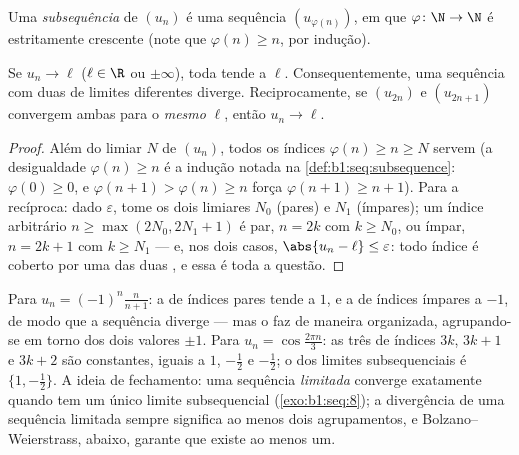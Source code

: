 \begin{definition}[Subsequência]\label{def:b1:seq:subsequence}
Uma \emph{subsequência} de $(u_n)$ é uma sequência
$(u_{\varphi(n)})$, em que $\varphi \colon \N \to \N$ é estritamente
crescente (note que $\varphi(n) \geq n$, por indução).
\end{definition}

\begin{proposition}\label{prop:b1:seq:subsequences}
Se $u_n \to \ell$ ($\ell \in \R$ ou $\pm\infty$), toda 
tende a $\ell$. Consequentemente, uma sequência com duas 
de limites diferentes diverge. Reciprocamente, se $(u_{2n})$ e
$(u_{2n+1})$ convergem ambas para o \emph{mesmo} $\ell$, então $u_n \to
\ell$.
\end{proposition}

\begin{proof}
Além do limiar $N$ de $(u_n)$, todos os índices $\varphi(n) \geq n
\geq N$ servem (a desigualdade $\varphi(n) \geq n$ é a
indução notada na \cref{def:b1:seq:subsequence}: $\varphi(0)
\geq 0$, e $\varphi(n+1) > \varphi(n) \geq n$ força
$\varphi(n+1) \geq n + 1$). Para a recíproca: dado
$\varepsilon$, tome os dois limiares $N_0$ (pares) e $N_1$
(ímpares); um índice arbitrário $n \geq \max(2N_0, 2N_1 + 1)$ é
par, $n = 2k$ com $k \geq N_0$, ou ímpar, $n = 2k+1$ com
$k \geq N_1$ --- e, nos dois casos, $\abs{u_n - \ell} \leq
\varepsilon$: todo índice é coberto por uma das duas
, e essa é toda a questão.
\end{proof}

\begin{example}\label{ex:b1:seq:sublimits}
Para $u_n = (-1)^n \frac{n}{n+1}$: a  de índices pares tende a
$1$, e a de índices ímpares a $-1$, de modo que a sequência diverge ---
mas o faz de maneira organizada, agrupando-se em torno dos dois valores
$\pm 1$. Para $u_n = \cos\frac{2\pi n}{3}$: as três  de
índices $3k$, $3k + 1$ e $3k + 2$ são constantes, iguais a $1$,
$-\frac12$ e $-\frac12$; o  dos limites subsequenciais é $\{1,
-\frac12\}$. A ideia de fechamento: uma sequência \emph{limitada}
converge exatamente quando tem um único limite subsequencial
(\cref{exo:b1:seq:8}); a divergência de uma sequência limitada sempre
significa ao menos dois agrupamentos, e Bolzano--Weierstrass, abaixo,
garante que existe ao menos um.
\end{example}

